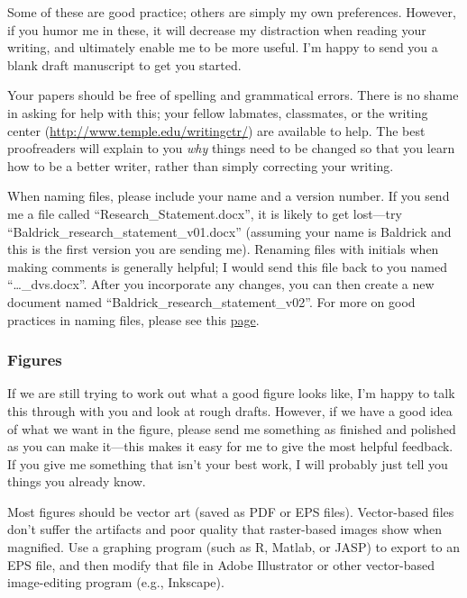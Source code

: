 \documentclass[letterpaper,12pt,oneside]{memoir}
\begin{document}
Some of these are good practice; others are simply my own preferences. However, if you humor me in these, it will decrease my distraction when reading your writing, and ultimately enable me to be more useful. I'm happy to send you a blank draft manuscript to get you started.

Your papers should be free of spelling and grammatical errors. There is no shame in asking for help with this; your fellow labmates, classmates, or the writing center (\url{http://www.temple.edu/writingctr/}) are available to help. The best proofreaders will explain to you \textit{why} things need to be changed so that you learn how to be a better writer, rather than simply correcting your writing. 


\begin{shaded}
\noindent When naming files, please include your name and a version number. If you send me a file called ``Research\_Statement.docx'', it is likely to get lost---try ``Baldrick\_research\_statement\_v01.docx'' (assuming your name is Baldrick and this is the first version you are sending me). Renaming files with initials when making comments is generally helpful; I would send this file back to you named ``\ldots\_dvs.docx''. After you incorporate any changes, you can then create a new document named ``Baldrick\_research\_statement\_v02''. For more on good practices in naming files, please see this \href{http://www2.stat.duke.edu/~rcs46/lectures_2015/01-markdown-git/slides/naming-slides/naming-slides.pdf}{page}.
\end{shaded}

\subsubsection{Figures}
If we are still trying to work out what a good figure looks like, I'm happy to talk this through with you and look at rough drafts. However, if we have a good idea of what we want in the figure, please send me something as finished and polished as you can make it---this makes it easy for me to give the most helpful feedback. If you give me something that isn't your best work, I will probably just tell you things you already know.

Most figures should be vector art (saved as PDF or EPS files). Vector-based files don't suffer the artifacts and poor quality that raster-based images show when magnified. Use a graphing program (such as R, Matlab, or JASP) to export to an EPS file, and then modify that file in Adobe Illustrator or other vector-based image-editing program (e.g., Inkscape).
\end{document}
